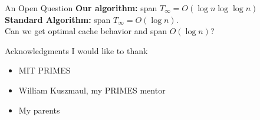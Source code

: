 \documentclass[xcolor=x11names, svgnames, rgb]{beamer}
\begin{document}


\begin{frame}[t]{An Open Question}
	\vspace{0.5cm}
	\textbf{Our algorithm:} span $T_\infty = O(\log n \log\log n)$\\
	\vspace{0.5cm}
	\textbf{Standard Algorithm:} span $T_\infty = O(\log n)$.\\
	\vspace{1cm}
	Can we get optimal cache behavior and span $O(\log n)$?
\end{frame}

\begin{frame}[t]{Acknowledgments}
I would like to thank
\begin{itemize}
	\item {MIT PRIMES}
	\item {William Kuszmaul, my PRIMES mentor}
	\item {My parents}
\end{itemize}
\end{frame}
\end{document}
